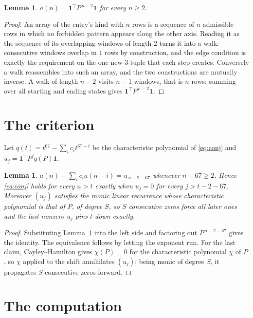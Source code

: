 \documentclass[11pt,a4paper]{article}
\theoremstyle{plain}
\newtheorem{lemma}[theorem]{Lemma}
\theoremstyle{definition}
\begin{document}
\begin{lemma}\label{lem:walk}
$a(n)=\mathbf{1}^{\!\top}P^{\,n-2}\mathbf{1}$ for every $n\ge2$.
\end{lemma}

\begin{proof}
An array of the entry's kind with $n$ rows is a sequence of $n$ admissible rows in
which no forbidden pattern appears along the other axis. Reading it as the sequence of its
overlapping windows of length $2$ turns it into a walk: consecutive windows overlap in
$1$ rows by construction, and the edge condition is exactly the requirement on the one
new $3$-tuple that each step creates. Conversely a walk reassembles into such an array,
and the two constructions are mutually inverse. A walk of length $n-2$ visits $n-1$
windows, that is $n$ rows; summing over all starting and ending states gives
$\mathbf{1}^{\!\top}P^{\,n-2}\mathbf{1}$.
\end{proof}

\section{The criterion}

Let $q(t)=t^{67}-\sum_i c_i t^{67-i}$ be the characteristic polynomial of
\eqref{eq:conj} and $u_j=\mathbf{1}^{\!\top}P^{j}q(P)\mathbf{1}$.

\begin{lemma}\label{lem:crit}
$a(n)-\sum_i c_i a(n-i)=u_{\,n-2-67}$ whenever $n-67\ge2$. Hence
\eqref{eq:conj} holds for every $n>t$ exactly when $u_j=0$ for every
$j>t-2-67$. Moreover $(u_j)$ satisfies the monic linear recurrence whose
characteristic polynomial is that of $P$, of degree $S$, so $S$ consecutive zeros force all
later ones and the last nonzero $u_j$ pins $t$ down exactly.
\end{lemma}

\begin{proof}
Substituting Lemma~\ref{lem:walk} into the left side and factoring out
$P^{\,n-2-67}$ gives the identity. The equivalence follows by letting the exponent
run. For the last claim, Cayley--Hamilton gives $\chi(P)=0$ for the characteristic
polynomial $\chi$ of $P$, so $\chi$ applied to the shift annihilates $(u_j)$; being monic of
degree $S$, it propagates $S$ consecutive zeros forward.
\end{proof}

\section{The computation}
\end{document}
